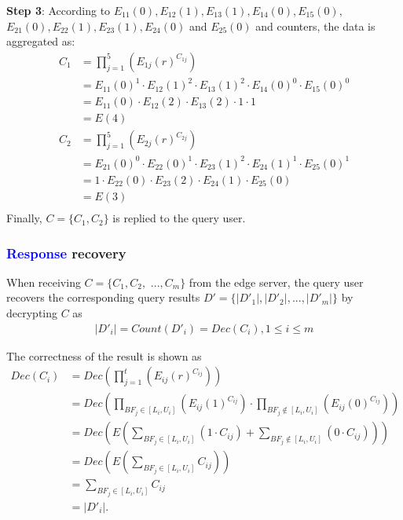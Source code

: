 \documentclass[IEEE JOURNAL OF BIOMEDICAL AND HEALTH INFORMATICS]{IEEEtran}
\begin{document}
{  \textbf{Step 3}: According to $E_{11}(0),E_{12}(1), E_{13}(1),E_{14}(0), E_{15}(0),$ $ E_{21}(0),E_{22}(1), E_{23}(1), E_{24}(0)$ and $E_{25}(0)$ and counters, the data is aggregated as:
  \begin{align*}
  		C_1 &= \prod_{j=1}^{5}(E_{1j}(r)^{C_{1j}})\\
  		    &= E_{11}(0)^{1} \cdot E_{12}(1)^{2} \cdot E_{13}(1)^{2} \cdot E_{14}(0)^{0} \cdot E_{15}(0)^{0} \\
  		    &= E_{11}(0) \cdot E_{12}(2) \cdot E_{13}(2) \cdot 1 \cdot 1\\
  		    &= E(4)\\
  		C_2 &= \prod_{j=1}^{5}(E_{2j}(r)^{C_{2j}})\\
  		    &= E_{21}(0)^{0} \cdot E_{22}(0)^{1} \cdot E_{23}(1)^{2} \cdot E_{24}(1)^{1} \cdot E_{25}(0)^{1} \\
  		    &= 1 \cdot E_{22}(0) \cdot E_{23}(2) \cdot E_{24}(1) \cdot E_{25}(0) \\
  		    &= E(3)\\	
  \end{align*}
  Finally, $C=\{C_1, C_2\}$ is replied to the query user.\\

	


\subsubsection{\textcolor{blue}{Response} recovery}
When receiving $C=\{C_1, C_2,$ $ ..., C_m\}$ from the edge server, the query user recovers the corresponding query results $D'=\{|D'_1|, |D'_2|, ... ,|D'_m|\}$ by decrypting $C$ as
\begin{align*}
|D'_i|= Count(D'_i) = Dec(C_i), 1\le i \le m
\end{align*}

The correctness of the result is shown as
\begin{align*}
	Dec(C_i) &= Dec(\prod_{j=1}^{t}(E_{ij}(r)^{C_{ij}})) \\
&= Dec(\prod_{BF_j\in [L_i, U_i]}(E_{ij}(1)^{C_{ij}}) \cdot \prod_{BF_j \notin [L_i, U_i]}(E_{ij}(0)^{C_{ij}})) \\
&= Dec(E(\sum_{BF_j \in [L_i, U_i]}(1\cdot C_{ij}) + \sum_{BF_j \notin [L_i, U_i]}(0\cdot C_{ij}))) \\
&= Dec(E(\sum_{BF_j \in [L_i, U_i]}C_{ij})) \\
&= \sum_{BF_j \in [L_i, U_i]}C_{ij}\ \ \ \ \ \ \ \ \ \ \ \ \ \ \ \ \ \ \ \ \ \ \ \ \ \ \ \ \ \ \ \ \ \ \ \ \\\
&= |D'_i|.
\end{align*}

}
\end{document}
